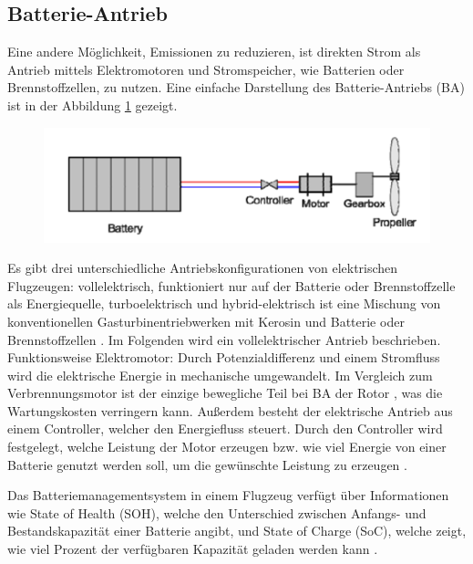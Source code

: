 \subsection{Batterie-Antrieb}
Eine andere Möglichkeit, Emissionen zu reduzieren, ist direkten Strom als Antrieb mittels Elektromotoren und Stromspeicher, wie Batterien oder Brennstoffzellen, zu nutzen.
Eine einfache Darstellung des Batterie-Antriebs (BA) ist in der Abbildung \ref{ba} gezeigt.
\begin{figure}[h]
	\centering
	\includegraphics[width=0.7\linewidth]{Bilder/BA.png}
	\caption[Einfachster Batterie-Antrieb]{ \cite{hepperle2012electric}}
	\label{ba}
\end{figure}

Es gibt drei unterschiedliche Antriebskonfigurationen von elektrischen Flugzeugen: vollelektrisch, funktioniert nur auf der Batterie oder
Brennstoffzelle als Energiequelle, turboelektrisch und hybrid-elektrisch ist eine Mischung von konventionellen 
Gasturbinentriebwerken mit Kerosin und Batterie oder Brennstoffzellen \cite{dahal2021techno}. %
Im Folgenden wird ein vollelektrischer Antrieb beschrieben.
%
Funktionsweise Elektromotor: Durch Potenzialdifferenz und einem Stromfluss wird die elektrische Energie in mechanische umgewandelt.
Im Vergleich zum Verbrennungsmotor ist der einzige bewegliche Teil bei BA der Rotor \cite{donckers2024electric}, 
was die Wartungskosten verringern kann. Außerdem besteht der elektrische Antrieb aus einem Controller, welcher den Energiefluss steuert. 
Durch den Controller wird festgelegt, welche Leistung der Motor erzeugen bzw. wie viel Energie von 
einer Batterie genutzt werden soll, um die gewünschte Leistung zu erzeugen \cite{donckers2024electric}. 

Das Batteriemanagementsystem in einem Flugzeug verfügt über Informationen wie State of Health (SOH), welche den Unterschied zwischen Anfangs-
und Bestandskapazität einer Batterie angibt, und State of Charge (SoC), welche zeigt, wie viel Prozent der verfügbaren Kapazität geladen werden kann \cite{donckers2024electric}.

